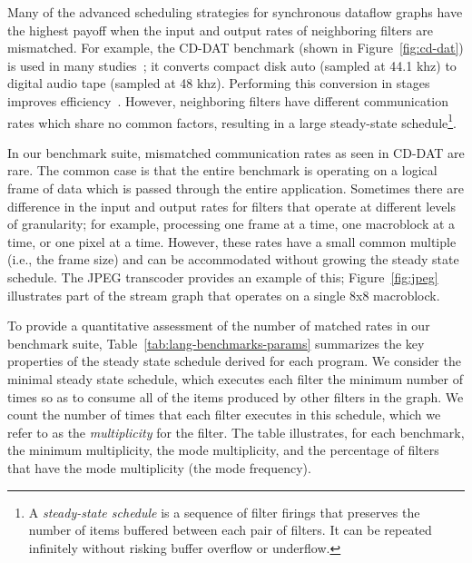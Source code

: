 \myitem {\matchedrates} Many of the advanced scheduling strategies for
synchronous dataflow graphs have the highest payoff when the input and
output rates of neighboring filters are mismatched.  For example, the
CD-DAT benchmark (shown in Figure~\ref{fig:cd-dat}) is used in many
studies~\cite{bhattacharya_quasi-static_2000,bhattacharyya_optimal_1995,chandrachoodan_efficient_2001,ko_memory-constrained_2006,murthy_minimizing_1994,murthy_buffer_2004,teich_3d_1999};
it converts compact disk auto (sampled at 44.1 khz) to digital audio
tape (sampled at 48 khz).  Performing this conversion in stages
improves efficiency~\cite{murthy_minimizing_1994}.  However,
neighboring filters have different communication rates which share no
common factors, resulting in a large steady-state schedule\footnote{A
  {\it steady-state schedule} is a sequence of filter firings that
  preserves the number of items buffered between each pair of filters.
  It can be repeated infinitely without risking buffer overflow or
  underflow.}.

In our benchmark suite, mismatched communication rates as seen in
CD-DAT are rare.  The common case is that the entire benchmark is
operating on a logical frame of data which is passed through the
entire application.  Sometimes there are difference in the input and
output rates for filters that operate at different levels of
granularity; for example, processing one frame at a time, one
macroblock at a time, or one pixel at a time.  However, these rates
have a small common multiple (i.e., the frame size) and can be
accommodated without growing the steady state schedule.  The JPEG
transcoder provides an example of this; Figure~\ref{fig:jpeg}
illustrates part of the stream graph that operates on a single 8x8
macroblock.
\label{sec:matched}

To provide a quantitative assessment of the number of matched rates in
our benchmark suite, Table~\ref{tab:lang-benchmarks-params} summarizes
the key properties of the steady state schedule derived for each
program.  We consider the minimal steady state schedule, which
executes each filter the minimum number of times so as to consume all
of the items produced by other filters in the graph.  We count the
number of times that each filter executes in this schedule, which we
refer to as the {\it multiplicity} for the filter.  The table
illustrates, for each benchmark, the minimum multiplicity, the mode
multiplicity, and the percentage of filters that have the mode
multiplicity (the mode frequency).

